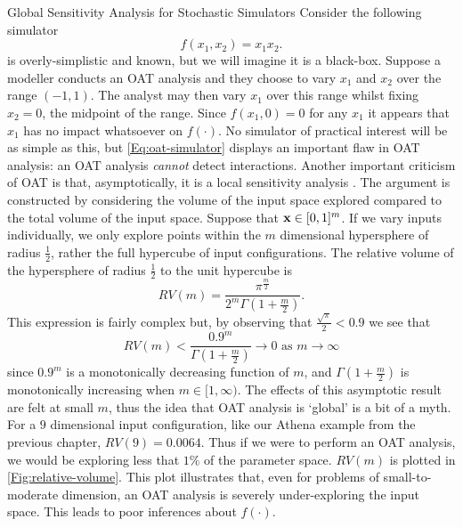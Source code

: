 \begin{chapter}{Global Sensitivity Analysis for Stochastic Simulators\label{Ch:sensitivity}}
Consider the following simulator
\begin{equation}
f(x_1, x_2) = x_1 x_2. \label{Eq:oat-simulator}
\end{equation}
 is overly-simplistic and known, but we will imagine it is a black-box. Suppose a modeller conducts an OAT analysis and they choose to vary $x_1$ and $x_2$ over the range $(-1,  1)$. The analyst may then vary $x_1$ over this range whilst fixing $x_2 = 0$, the midpoint of the range. Since $f(x_1, 0) = 0$ for any $x_1$ it appears that $x_1$ has no impact whatsoever on $f(\cdot)$. No simulator of practical interest will be as simple as this, but  \cref{Eq:oat-simulator} displays an important flaw in OAT analysis: an OAT analysis \textit{cannot} detect interactions. Another important criticism of OAT is that, asymptotically, it is a local sensitivity analysis \citep{Saltelli2010}. The argument is constructed by considering the volume of the input space explored compared to the total volume of the input space. Suppose that $\mathbf{x} \in [0,1]^m$. If we vary inputs individually, we only explore points within the $m$ dimensional hypersphere of radius $\frac{1}{2}$, rather the full hypercube of input configurations. The relative volume of the hypersphere of radius $\frac{1}{2}$ to the unit hypercube is
\begin{equation}
  RV(m) = \frac{\pi^{\frac{m}{2}}}{2^m \Gamma\left(1 + \frac{m}{2}\right)}.
\end{equation}
This expression is fairly complex but, by observing that $\frac{\sqrt{\pi}}{2} < 0.9$ we see that
\begin{equation}
  RV(m) < \frac{0.9^m}{ \Gamma \left(1 + \frac{m}{2}\right) } \to 0 \text{ as } m \to \infty
\end{equation}
since $0.9^m$ is a monotonically decreasing function of $m$, and $\Gamma(1 + \frac{m}{2})$ is monotonically increasing when $m \in [1, \infty)$. The effects of this asymptotic result are felt at small $m$, thus the idea that OAT analysis is `global' is a bit of a myth. For a $9$ dimensional input configuration, like our Athena example from the previous chapter, $RV(9) = 0.0064$. Thus if we were to perform an OAT analysis, we would be exploring less that $1\%$ of the parameter space. $RV(m)$ is plotted in \cref{Fig:relative-volume}. This plot illustrates that, even for problems of small-to-moderate dimension, an OAT analysis is severely under-exploring the input space.  This leads to poor inferences about $f(\cdot)$.
\begin{figure}

\end{figure}
\end{chapter}
